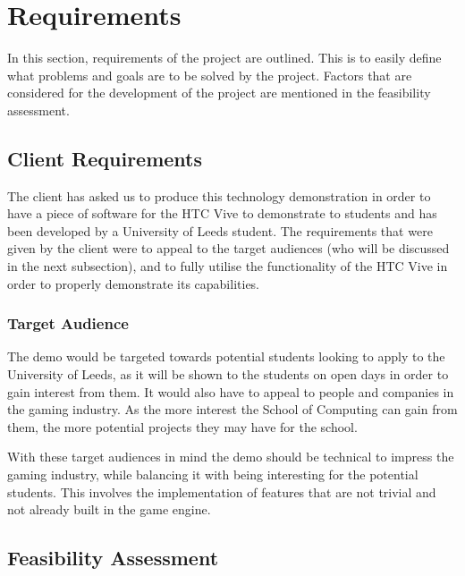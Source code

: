 \chapter{Requirements}
\label{chapter3}

In this section, requirements of the project are outlined. This is to easily define what problems and goals are to be solved by the project. Factors that are considered for the development of the project are mentioned in the feasibility assessment.

\section{Client Requirements}

The client has asked us to produce this technology demonstration in order to have a piece of software for the HTC Vive to demonstrate to students and has been developed by a University of Leeds student. The requirements that were given by the client were to appeal to the target audiences (who will be discussed in the next subsection), and to fully utilise the functionality of the HTC Vive in order to properly demonstrate its capabilities.

\subsection{Target Audience}
The demo would be targeted towards potential students looking to apply to the University of Leeds, as it will be shown to the students on open days in order to gain interest from them.
It would also have to appeal to people and companies in the gaming industry. As the more interest the School of Computing can gain from them, the more potential projects they may have for the school.
\newline
\par
With these target audiences in mind the demo should be technical to impress the gaming industry, while balancing it with being interesting for the potential students. This involves the implementation of features that are not trivial and not already built in the game engine.

\section{Feasibility Assessment}
